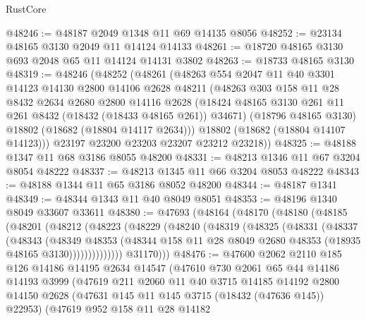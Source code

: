 \begin{lexlean}{RustCore}
\begin{coremodule}
@48246 := @48187 @2049 @1348 @11 @69 @14135 @8056
@48252 := @23134 @48165 @3130 @2049 @11 @14124 @14133
@48261 := @18720 @48165 @3130 @693 @2048 @65 @11 @14124 @14131 @3802
@48263 := @18733 @48165 @3130
@48319 := @48246
    (@48252
      (@48261
        (@48263
          @554
          @2047
          @11
          @40
          @3301
          @14123
          @14130
          @2800
          @14106
          @2628
          @48211
          (@48263
            @303
            @158
            @11
            @28
            @8432
            @2634
            @2680
            @2800
            @14116
            @2628
            (@18424 @48165 @3130 @261 @11 @261 @8432 (@18432 (@18433 @48165 @261)) @34671)
            (@18796 @48165 @3130)
            @18802
            (@18682 (@18804 @14117 @2634)))
          @18802
          (@18682 (@18804 @14107 @14123)))
        @23197
        @23200
        @23203
        @23207
        @23212
        @23218))
@48325 := @48188 @1347 @11 @68 @3186 @8055 @48200
@48331 := @48213 @1346 @11 @67 @3204 @8054 @48222
@48337 := @48213 @1345 @11 @66 @3204 @8053 @48222
@48343 := @48188 @1344 @11 @65 @3186 @8052 @48200
@48344 := @48187 @1341
@48349 := @48344 @1343 @11 @40 @8049 @8051
@48353 := @48196 @1340 @8049 @33607 @33611
@48380 := @47693
    (@48164
      (@48170
        (@48180
          (@48185
            (@48201
              (@48212
                (@48223
                  (@48229
                    (@48240
                      (@48319
                        (@48325
                          (@48331
                            (@48337
                              (@48343
                                (@48349
                                  @48353
                                  (@48344
                                    @158
                                    @11
                                    @28
                                    @8049
                                    @2680
                                    @48353
                                    (@18935 @48165 @3130))))))))))))))
          @31170)))
@48476 := @47600
    @2062
    @2110
    @185
    @126
    @14186
    @14195
    @2634
    @14547
    (@47610
      @730
      @2061
      @65
      @44
      @14186
      @14193
      @3999
      (@47619
        @211
        @2060
        @11
        @40
        @3715
        @14185
        @14192
        @2800
        @14150
        @2628
        (@47631 @145 @11 @145 @3715 (@18432 (@47636 @145)) @22953)
        (@47619
          @952
          @158
          @11
          @28
          @14182

\end{coremodule}
\end{lexlean}
